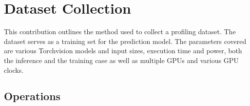 \chapter{Dataset Collection}\label{chap:contrib1}


This contribution outlines the method used to collect a profiling dataset. The  dataset serves as a training set for the prediction model. The parameters covered are various Torchvision models and input sizes, execution time and power, both the inference and the training case as well as multiple GPUs and various GPU clocks.


\section{Operations}


